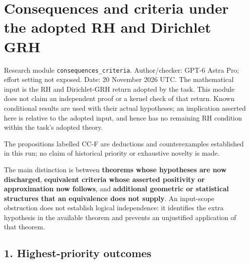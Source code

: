 \section{Consequences and criteria under the adopted RH and Dirichlet
GRH}\label{consequences-and-criteria-under-the-adopted-rh-and-dirichlet-grh}

Research module \texttt{consequences\_criteria}. Author/checker: GPT-6
Astra Pro; effort setting not exposed. Date: 20 November 2026 UTC. The
mathematical input is the RH and Dirichlet-GRH return adopted by the
task. This module does not claim an independent proof or a kernel check
of that return. Known conditional results are used with their actual
hypotheses; an implication asserted here is relative to the adopted
input, and hence has no remaining RH condition within the task's adopted
theory.

The propositions labelled CC-F are deductions and counterexamples
established in this run; no claim of historical priority or exhaustive
novelty is made.

The main distinction is between \textbf{theorems whose hypotheses are
now discharged}, \textbf{equivalent criteria whose asserted positivity
or approximation now follows}, and \textbf{additional geometric or
statistical structures that an equivalence does not supply}. An
input-scope obstruction does not establish logical independence: it
identifies the extra hypothesis in the available theorem and prevents an
unjustified application of that theorem.

\subsection{1. Highest-priority
outcomes}\label{highest-priority-outcomes}

